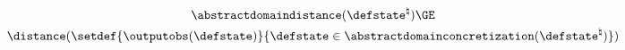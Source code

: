 \begin{gather*}
\abstractdomaindistance(\defstate^\natural) \GE \\
\distance(\setdef{\outputobs(\defstate)}{\defstate\in\abstractdomainconcretization(\defstate^\natural)})
\end{gather*}
